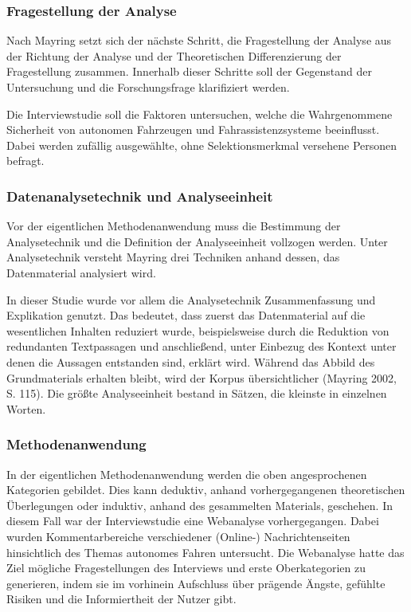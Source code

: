 \documentclass[12pt]{article}
\begin{document}
\subsubsection*{Fragestellung der Analyse}
Nach Mayring setzt sich der nächste Schritt, die \glq Fragestellung der Analyse\grq{} aus der \glq Richtung der Analyse\grq{} und der \glq Theoretischen Differenzierung der Fragestellung\grq{} zusammen. Innerhalb dieser Schritte soll der Gegenstand der Untersuchung und die Forschungsfrage klarifiziert werden.

Die Interviewstudie soll die Faktoren untersuchen, welche die Wahrgenommene Sicherheit von autonomen Fahrzeugen und Fahrassistenzsysteme beeinflusst. Dabei werden zufällig ausgewählte, ohne Selektionsmerkmal versehene Personen befragt.

\subsubsection*{Datenanalysetechnik und Analyseeinheit}
Vor der eigentlichen Methodenanwendung muss die \glq Bestimmung der Analysetechnik\grq{} und die \glq Definition der Analyseeinheit\grq{} vollzogen werden. Unter Analysetechnik versteht Mayring drei Techniken anhand dessen, das Datenmaterial analysiert wird.

In dieser Studie wurde vor allem die Analysetechnik \glq Zusammenfassung\grq{} und \glq Explikation\grq{} genutzt. Das bedeutet, dass zuerst das Datenmaterial auf die wesentlichen Inhalten reduziert wurde, beispielsweise durch die Reduktion von redundanten Textpassagen und anschließend, unter Einbezug des Kontext unter denen die Aussagen entstanden sind, erklärt wird. Während das \glq Abbild des Grundmaterials\grq{} erhalten bleibt, wird der Korpus übersichtlicher (Mayring 2002, S. 115). Die größte Analyseeinheit bestand in Sätzen, die kleinste in einzelnen Worten.

\subsubsection*{Methodenanwendung}
In der eigentlichen Methodenanwendung werden die oben angesprochenen Kategorien gebildet. Dies kann deduktiv, anhand vorhergegangenen theoretischen Überlegungen oder induktiv, anhand des gesammelten Materials, geschehen.
In diesem Fall war der Interviewstudie eine Webanalyse vorhergegangen. Dabei wurden Kommentarbereiche verschiedener (Online-) Nachrichtenseiten hinsichtlich des Themas autonomes Fahren untersucht. Die Webanalyse hatte das Ziel mögliche Fragestellungen des Interviews und erste Oberkategorien zu generieren, indem sie im vorhinein Aufschluss über prägende Ängste, gefühlte Risiken und die Informiertheit der Nutzer gibt.
\end{document}
